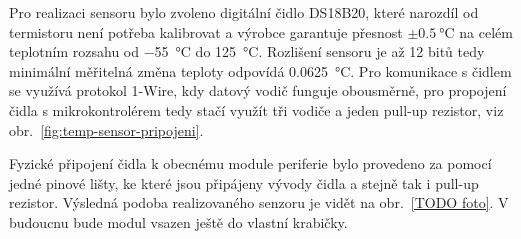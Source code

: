         Pro realizaci sensoru bylo zvoleno digitální čidlo DS18B20, které narozdíl od termistoru není potřeba kalibrovat a výrobce garantuje přesnost \(\pm \qty{0.5}{\degreeCelsius}\) na celém teplotním rozsahu od \qty{-55}{\degreeCelsius} do \qty{+125}{\degreeCelsius}. Rozlišení sensoru je až 12 bitů tedy minimální měřitelná změna teploty odpovídá \qty{0.0625}{\degreeCelsius}. Pro komunikace s čidlem se využívá protokol 1-Wire, kdy datový vodič funguje obousměrně, pro propojení čidla s mikrokontrolérem tedy stačí využít tři vodiče a jeden pull-up rezistor, viz obr.~\ref{fig:temp-sensor-pripojeni}. 
        
        Fyzické připojení čidla k obecnému module periferie bylo provedeno za pomocí jedné pinové lišty, ke které jsou připájeny vývody čidla a stejně tak i pull-up rezistor. Výsledná podoba realizovaného senzoru je vidět na obr.~\ref{TODO foto}. V budoucnu bude modul vsazen ještě do vlastní krabičky.
